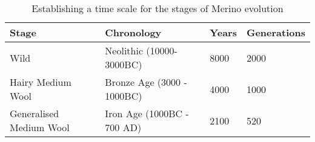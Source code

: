 %

\begin{table}[h]
\centering
\caption{Establishing a time scale for the stages of Merino evolution}
\label{tab:timescale}
\vspace{0.1in}
\begin{tabular}{l|l|l|l}  \hline
  Stage &  Chronology &  Years  & Generations \\ \hline
  Wild   & Neolithic (10000-3000BC) & 8000     & 2000 \\
  Hairy Medium Wool & Bronze Age (3000 - 1000BC) & 4000 & 1000 \\
  Generalised Medium Wool & Iron Age (1000BC - 700 AD) & 2100 & 520 \\ \hline
\end{tabular}
\end{table}

%
